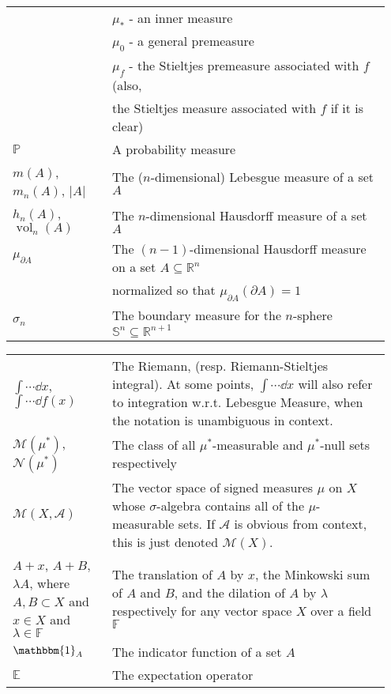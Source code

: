 \begin{center}
\begin{tabular}{|p{0.25\linewidth}|p{0.7\linewidth}|}
	& \qquad $\mu_*$ - an inner measure \\
	& \qquad $\mu_0$ - a general premeasure \\
	& \qquad $\mu_f$ - the Stieltjes premeasure associated with $f$ (also, \\
	& \qquad\qquad the Stieltjes measure associated with $f$ if it is clear)\smallskip\\
	$\mathbb{P}$ & A probability measure \\
	$m(A)$, $m_n(A)$, $|A|$ & The ($n$-dimensional) Lebesgue measure of a set $A$\\
	$h_n(A)$, $\operatorname{vol}_n(A)$ & The $n$-dimensional Hausdorff measure of a set $A$\\
	$\mu_{\partial A}$ & The $(n-1)$-dimensional Hausdorff measure on a set $A\subseteq \mathbb{R}^n$ \\
	& normalized so that $\mu_{\partial A}(\partial A) = 1$\\
	$\sigma_n$ & The boundary measure for the $n$-sphere $\mathbb{S}^n\subseteq \mathbb{R}^{n+1}$\\
	\hline
\end{tabular}
\end{center}
\newpage
\begin{center}
\begin{tabular}{|p{0.25\linewidth}|p{0.7\linewidth}|}
	\hline\medskip

	$\displaystyle \int \cdots \dd{x}$,  $\displaystyle \int \cdots \dd{f(x)}$ & The Riemann, (resp. Riemann-Stieltjes integral). At some points, $\int \cdots \dd{x}$ will also refer to integration w.r.t. Lebesgue Measure, when the notation is unambiguous in context. \smallskip\\
	$\mathcal{M}(\mu^*)$, $\mathcal{N}(\mu^*)$ & The class of all $\mu^*$-measurable and $\mu^*$-null sets respectively\smallskip\\
	$\mathcal{M}(X, \mathcal{A})$ & The vector space of signed measures $\mu$ on $X$ whose $\sigma$-algebra contains all of the $\mu$-measurable sets. If $\mathcal{A}$ is obvious from context, this is just denoted $\mathcal{M}(X)$. \smallskip\\
	$A +x$, $A + B$, $\lambda A$, where $A, B \subset X$ and $x\in X$ and $\lambda \in \mathbb{F}$ & The translation of $A$ by $x$, the Minkowski sum of $A$ and $B$, and the dilation of $A$ by $\lambda$ respectively for any vector space $X$ over a field $\mathbb{F}$\\
	$\mathbbm{1}_A$ & The indicator function of a set $A$\\
	$\mathbb{E}$ & The expectation operator\\
	
	\hline
\end{tabular}
\end{center}
